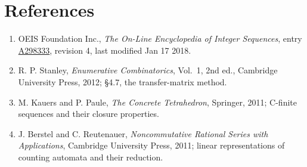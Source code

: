 \documentclass[11pt]{article}
\theoremstyle{definition}
\begin{document}
\section{References}

\begin{enumerate}

\item OEIS Foundation Inc., \emph{The On-Line Encyclopedia of Integer Sequences}, entry \href{https://oeis.org/A298333}{A298333}, revision 4, last modified Jan 17 2018.

\item R. P. Stanley, \emph{Enumerative Combinatorics}, Vol.~1, 2nd ed., Cambridge University Press, 2012; \S4.7, the transfer-matrix method.

\item M. Kauers and P. Paule, \emph{The Concrete Tetrahedron}, Springer, 2011; C-finite sequences and their closure properties.

\item J. Berstel and C. Reutenauer, \emph{Noncommutative Rational Series with Applications}, Cambridge University Press, 2011; linear representations of counting automata and their reduction.

\end{enumerate}
\end{document}
